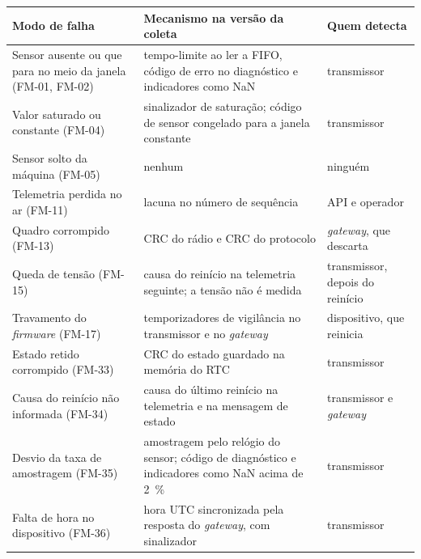 \begin{quadro}[!htb]
\centering\small
\caption{Modos de falha da FMEA na versão da coleta}\label{quadro:sis-falhas}
\begin{tabular}{@{}>{\raggedright\arraybackslash}p{44mm}>{\raggedright\arraybackslash}p{72mm}>{\raggedright\arraybackslash}p{34mm}@{}}
\toprule
Modo de falha & Mecanismo na versão da coleta & Quem detecta \\
\midrule
Sensor ausente ou que para no meio da janela (FM-01, FM-02) & tempo-limite ao ler a FIFO, código de erro no diagnóstico e indicadores como NaN & transmissor \\
\addlinespace
Valor saturado ou constante (FM-04) & sinalizador de saturação; código de sensor congelado para a janela constante & transmissor \\
\addlinespace
Sensor solto da máquina (FM-05) & nenhum & ninguém \\
\addlinespace
Telemetria perdida no ar (FM-11) & lacuna no número de sequência & API e operador \\
\addlinespace
Quadro corrompido (FM-13) & CRC do rádio e CRC do protocolo & \textit{gateway}, que descarta \\
\addlinespace
Queda de tensão (FM-15) & causa do reinício na telemetria seguinte; a tensão não é medida & transmissor, depois do reinício \\
\addlinespace
Travamento do \textit{firmware} (FM-17) & temporizadores de vigilância no transmissor e no \textit{gateway} & dispositivo, que reinicia \\
\addlinespace
Estado retido corrompido (FM-33) & CRC do estado guardado na memória do RTC & transmissor \\
\addlinespace
Causa do reinício não informada (FM-34) & causa do último reinício na telemetria e na mensagem de estado & transmissor e \textit{gateway} \\
\addlinespace
Desvio da taxa de amostragem (FM-35) & amostragem pelo relógio do sensor; código de diagnóstico e indicadores como NaN acima de \SI{2}{\percent} & transmissor \\
\addlinespace
Falta de hora no dispositivo (FM-36) & hora UTC sincronizada pela resposta do \textit{gateway}, com sinalizador & transmissor \\
\bottomrule
\end{tabular}
\end{quadro}

